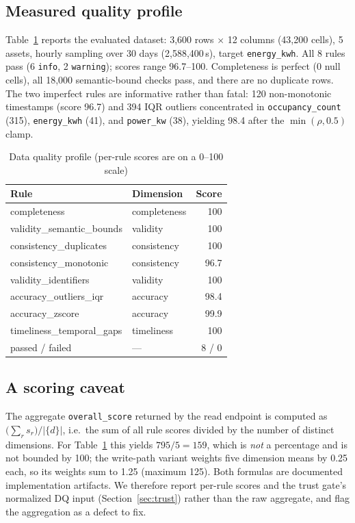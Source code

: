 \documentclass[conference]{IEEEtran}
\begin{document}
\subsection{Measured quality profile}\label{sec:dq-results}
Table~\ref{tab:dq} reports the evaluated dataset: 3{,}600 rows $\times$ 12 columns (43{,}200 cells), 5 assets, hourly sampling over 30 days (2{,}588{,}400\,s), target \texttt{energy\_kwh}. All 8 rules pass (6 \texttt{info}, 2 \texttt{warning}); scores range 96.7--100. Completeness is perfect (0 null cells), all 18{,}000 semantic-bound checks pass, and there are no duplicate rows. The two imperfect rules are informative rather than fatal: 120 non-monotonic timestamps (score 96.7) and 394 IQR outliers concentrated in \texttt{occupancy\_count} (315), \texttt{energy\_kwh} (41), and \texttt{power\_kw} (38), yielding 98.4 after the $\min(\rho,0.5)$ clamp.

\begin{table}[!t]
\caption{Data quality profile (per-rule scores are on a 0--100 scale)}
\label{tab:dq}
\centering
\begin{tabular}{@{}llr@{}}
\toprule
Rule & Dimension & Score \\
\midrule
completeness & completeness & 100 \\
validity\_semantic\_bounds & validity & 100 \\
consistency\_duplicates & consistency & 100 \\
consistency\_monotonic & consistency & 96.7 \\
validity\_identifiers & validity & 100 \\
accuracy\_outliers\_iqr & accuracy & 98.4 \\
accuracy\_zscore & accuracy & 99.9 \\
timeliness\_temporal\_gaps & timeliness & 100 \\
\midrule
passed / failed & --- & 8 / 0 \\
\bottomrule
\end{tabular}
\end{table}

\subsection{A scoring caveat}\label{sec:dq-score}
The aggregate \texttt{overall\_score} returned by the read endpoint is computed as $\big(\sum_r s_r\big)/|\{d\}|$, i.e.\ the sum of all rule scores divided by the number of distinct dimensions. For Table~\ref{tab:dq} this yields $795/5 = 159$, which is \emph{not} a percentage and is not bounded by 100; the write-path variant weights five dimension means by 0.25 each, so its weights sum to 1.25 (maximum 125). Both formulas are documented implementation artifacts. We therefore report per-rule scores and the trust gate's normalized DQ input (Section~\ref{sec:trust}) rather than the raw aggregate, and flag the aggregation as a defect to fix.
\end{document}
